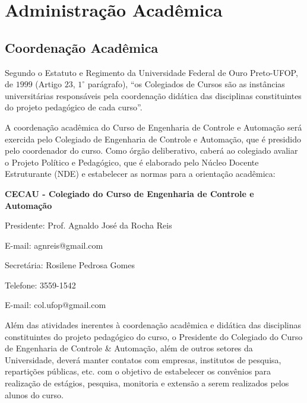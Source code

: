 \chapter{Administra{\c c}{\~a}o Acad{{\^e}mica}}
\label{cap:03} 

\section{Coordenação Acadêmica}
Segundo o Estatuto e Regimento da Universidade Federal de Ouro Preto-UFOP, de $1999$ (Artigo $23$, $ 1^{\circ}$  parágrafo), ``os Colegiados de Cursos são as instâncias universitárias responsáveis pela coordenação didática das disciplinas constituintes do projeto pedagógico de cada curso''.

A coordenação acadêmica do Curso de Engenharia de Controle e Automação será exercida pelo Colegiado de Engenharia de Controle e Automação, que é presidido pelo coordenador do curso. Como órgão deliberativo, caberá ao colegiado avaliar o Projeto Político e Pedagógico, que é elaborado pelo Núcleo Docente Estruturante (NDE) e estabelecer as normas para a orientação acadêmica:

\textbf{CECAU - Colegiado do Curso de Engenharia de Controle e Automação}

Presidente: Prof. Agnaldo José da Rocha Reis

E-mail: agnreis@gmail.com

Secretária: Rosilene Pedrosa Gomes

Telefone: 3559-1542

E-mail: col.ufop@gmail.com

Além das atividades inerentes à coordenação acadêmica e didática das disciplinas constituintes do projeto pedagógico do curso, o Presidente do Colegiado do Curso de Engenharia de Controle \& Automação, além de outros setores da Universidade, deverá manter contatos com empresas, institutos de pesquisa, repartições públicas, etc. com o objetivo de estabelecer os convênios para realização de estágios, pesquisa, monitoria e extensão a serem realizados pelos alunos do curso.

